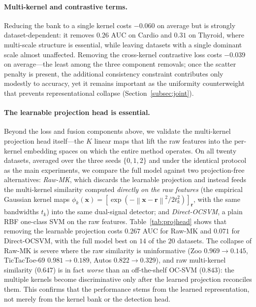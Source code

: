 \documentclass[times, review, 10pt]{elsarticle}
\newcommand{\norm}[1]{\left\lVert #1 \right\rVert}
\newcommand{\xx}{\bm{x}}
\begin{document}
\paragraph{Multi-kernel and contrastive terms.}
Reducing the bank to a single kernel costs $-0.060$ on average but is strongly
dataset-dependent: it removes $0.26$ AUC on Cardio and $0.31$ on Thyroid, where
multi-scale structure is essential, while leaving datasets with a single dominant
scale almost unaffected. Removing the cross-kernel contrastive loss costs
$-0.039$ on average---the least among the three component removals; once the
scatter penalty is present, the additional
consistency constraint contributes only modestly to accuracy, yet it remains
important as the uniformity counterweight that prevents representational collapse
(Section~\ref{subsec:joint}).

\paragraph{The learnable projection head is essential.}
Beyond the loss and fusion components above, we validate the multi-kernel projection
head itself---the $K$ linear maps that lift the raw features into the per-kernel
embedding spaces on which the entire method operates. On all twenty datasets, averaged
over the three seeds $\{0,1,2\}$ and under the identical protocol as the main
experiments, we compare the full model against two projection-free alternatives:
\emph{Raw-MK}, which discards the learnable projection and instead feeds the multi-kernel
similarity computed \emph{directly on the raw features} (the empirical Gaussian kernel
maps $\phi_k(\xx)=[\exp(-\norm{\xx-\bm{r}}^2/2t_k^2)]_{\bm{r}}$, with the same bandwidths
$t_k$) into the same dual-signal detector; and \emph{Direct-OCSVM}, a plain RBF one-class
SVM on the raw features. Table~\ref{tab:projhead} shows that removing the learnable
projection costs $0.267$ AUC for Raw-MK and $0.071$ for Direct-OCSVM, with the full model
best on $14$ of the $20$ datasets. The collapse of Raw-MK is severe where the raw
similarity is uninformative (Zoo $0.969\!\to\!0.145$, TicTacToe-69 $0.981\!\to\!0.189$,
Autos $0.822\!\to\!0.329$), and raw multi-kernel similarity ($0.647$) is in fact
\emph{worse} than an off-the-shelf OC-SVM ($0.843$): the multiple kernels become
discriminative only after the learned projection reconciles them. This confirms that the
performance stems from the learned representation, not merely from the kernel bank or the
detection head.
\end{document}
